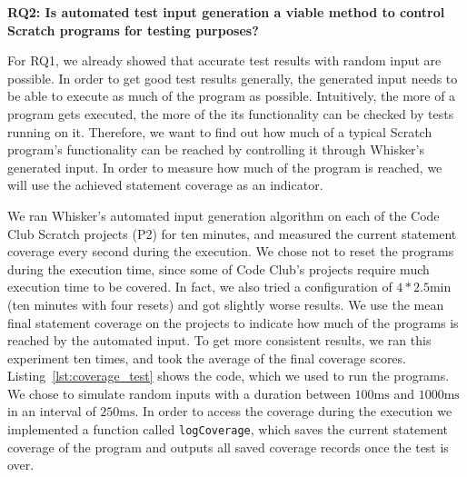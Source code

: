 \begin{center}\begin{minipage}{.9\textwidth}
    \textbf{RQ2: Is automated test input generation a viable method to control Scratch programs for testing purposes?}
\end{minipage}\end{center}

\noindent For RQ1, we already showed that accurate test results with random input are possible.
In order to get good test results generally, the generated input needs to be able to execute as much of the program as possible.
Intuitively, the more of a program gets executed, the more of the its functionality can be checked by tests running on it.
Therefore, we want to find out how much of a typical Scratch program's functionality can be reached by controlling it through Whisker's generated input.
In order to measure how much of the program is reached, we will use the achieved statement coverage as an indicator.
\parspace

We ran Whisker's automated input generation algorithm on each of the Code Club Scratch projects (P2) for ten minutes,
and measured the current statement coverage every second during the execution.
We chose not to reset the programs during the execution time,
since some of Code Club's projects require much execution time to be covered.
In fact, we also tried a configuration of $4 * 2.5\text{min}$ (ten minutes with four resets)
and got slightly worse results.
We use the mean final statement coverage on the projects to indicate how much of the programs is reached by the automated input.
To get more consistent results, we ran this experiment ten times, and took the average of the final coverage scores.
Listing~\ref{lst:coverage_test} shows the code, which we used to run the programs.
We chose to simulate random inputs with a duration between $100\text{ms}$ and $1000\text{ms}$ in an interval of $250\text{ms}$.
In order to access the coverage during the execution we implemented a function called \texttt{logCoverage},
which saves the current statement coverage of the program and outputs all saved coverage records once the test is over.
\parspace



